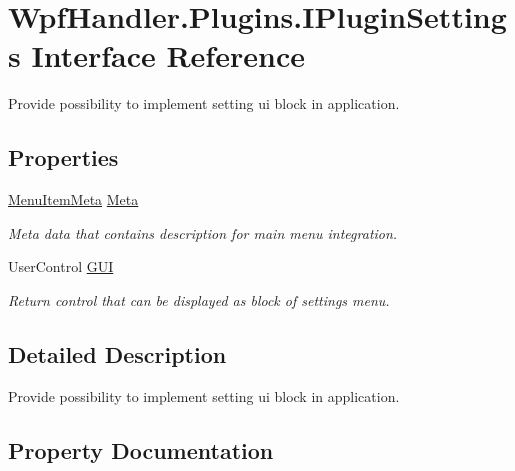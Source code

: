 \hypertarget{interface_wpf_handler_1_1_plugins_1_1_i_plugin_settings}{}\section{Wpf\+Handler.\+Plugins.\+I\+Plugin\+Settings Interface Reference}
\label{interface_wpf_handler_1_1_plugins_1_1_i_plugin_settings}


Provide possibility to implement setting ui block in application.  


\subsection*{Properties}
\begin{DoxyCompactItemize}
\item 
\mbox{\hyperlink{class_wpf_handler_1_1_plugins_1_1_menu_item_meta}{Menu\+Item\+Meta}} \mbox{\hyperlink{interface_wpf_handler_1_1_plugins_1_1_i_plugin_settings_a63a2624a2e5f76e870817ebb292ec462}{Meta}}
\begin{DoxyCompactList}\small\item\em Meta data that contains description for main menu integration. \end{DoxyCompactList}\item 
User\+Control \mbox{\hyperlink{interface_wpf_handler_1_1_plugins_1_1_i_plugin_settings_a61126c998a55b28a6f7f79905621fc54}{G\+UI}}
\begin{DoxyCompactList}\small\item\em Return control that can be displayed as block of settings menu. \end{DoxyCompactList}\end{DoxyCompactItemize}


\subsection{Detailed Description}
Provide possibility to implement setting ui block in application. 



\subsection{Property Documentation}
\mbox{\label{interface_wpf_handler_1_1_plugins_1_1_i_plugin_settings_a61126c998a55b28a6f7f79905621fc54}} 

